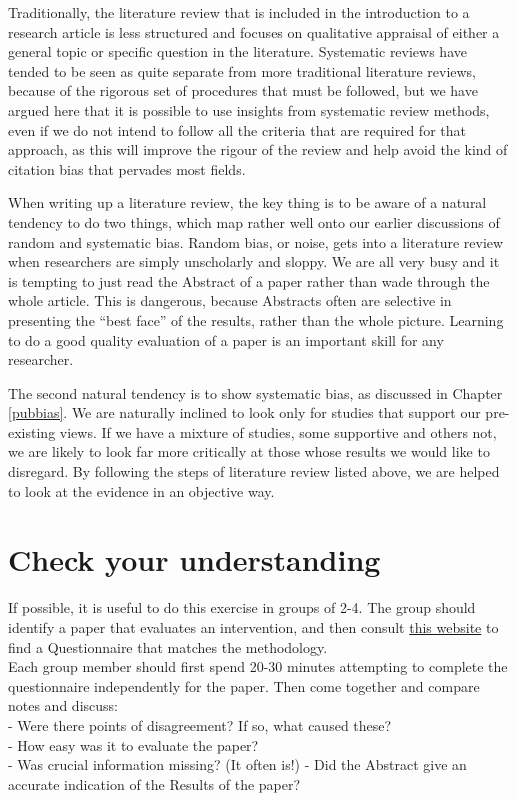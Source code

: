 \documentclass{krantz}
\begin{document}
Traditionally, the literature review that is included in the introduction to a research article is less structured and focuses on qualitative appraisal of either a general topic or specific question in the literature. Systematic reviews have tended to be seen as quite separate from more traditional literature reviews, because of the rigorous set of procedures that must be followed, but we have argued here that it is possible to use insights from systematic review methods, even if we do not intend to follow all the criteria that are required for that approach, as this will improve the rigour of the review and help avoid the kind of citation bias that pervades most fields.

When writing up a literature review, the key thing is to be aware of a natural tendency to do two things, which map rather well onto our earlier discussions of random and systematic bias. Random bias, or noise, gets into a literature review when researchers are simply unscholarly and sloppy. We are all very busy and it is tempting to just read the Abstract of a paper rather than wade through the whole article. This is dangerous, because Abstracts often are selective in presenting the ``best face'' of the results, rather than the whole picture. Learning to do a good quality evaluation of a paper is an important skill for any researcher.

The second natural tendency is to show systematic bias, as discussed in Chapter \ref{pubbias}. We are naturally inclined to look only for studies that support our pre-existing views. If we have a mixture of studies, some supportive and others not, we are likely to look far more critically at those whose results we would like to disregard. By following the steps of literature review listed above, we are helped to look at the evidence in an objective way.

\hypertarget{check-your-understanding-22}{%
\section{Check your understanding}\label{check-your-understanding-22}}

If possible, it is useful to do this exercise in groups of 2-4. The group should identify a paper that evaluates an intervention, and then consult \href{https://cebma.org/resources-and-tools/what-is-critical-appraisal/}{this website} to find a Questionnaire that matches the methodology.\\
Each group member should first spend 20-30 minutes attempting to complete the questionnaire independently for the paper. Then come together and compare notes and discuss:\\
- Were there points of disagreement? If so, what caused these?\\
- How easy was it to evaluate the paper?\\
- Was crucial information missing? (It often is!) - Did the Abstract give an accurate indication of the Results of the paper?
\end{document}

